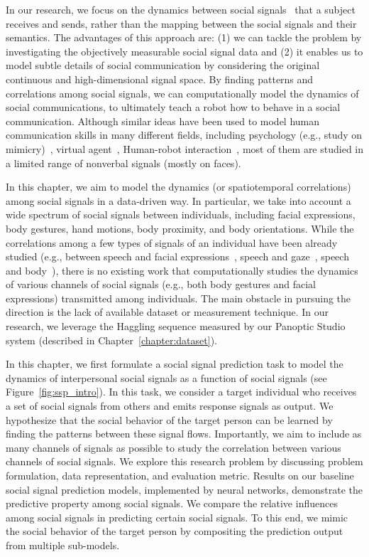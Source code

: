 In our research, we focus on the dynamics between social signals~\cite{pentland2004social} that a subject receives and sends, rather than the mapping between the social signals and their semantics. The advantages of this approach are: (1) we can tackle the problem by investigating the objectively measurable social signal data and (2) it enables us to model subtle details of social communication by considering the original continuous and high-dimensional signal space. By finding patterns and correlations among social signals, we can computationally model the dynamics of social communications, to ultimately teach a robot how to behave in a social communication. Although similar ideas have been used to model human communication skills in many different fields, including psychology (e.g., study on mimicry)~\cite{bernieri1988synchrony}, virtual agent~\cite{morency2008predicting,morency2010modeling}, Human-robot interaction~\cite{huang2014learning}, most of them are studied in a limited range of nonverbal signals (mostly on faces). 

In this chapter, we aim to model the dynamics (or spatiotemporal correlations) among social signals in a data-driven way. In particular, we take into account a wide spectrum of social signals between individuals, including facial expressions, body gestures, hand motions, body proximity, and body orientations. While the correlations among a few types of signals of an individual have been already studied (e.g., between speech and facial expressions~\cite{kendon1980gesticulation, mcneill1992hand}, speech and gaze~\cite{griffin2001gaze}, speech and body~\cite{levine2010gesture,marsella2013virtual}), there is no existing work that computationally studies the dynamics of various channels of social signals (e.g., both body gestures and facial expressions) transmitted among individuals. The main obstacle in pursuing the direction is the lack of available dataset or measurement technique. In our research, we leverage the Haggling sequence measured by our Panoptic Studio system (described in Chapter~\ref{chapter:dataset}).

In this chapter, we first formulate a social signal prediction task to model the dynamics of interpersonal social signals as a function of social signals (see Figure~\ref{fig:ssp_intro}). In this task, we consider a target individual who receives a set of social signals from others and emits response signals as output. We hypothesize that the social behavior of the target person can be learned by finding the patterns between these signal flows. Importantly, we aim to include as many channels of signals as possible to study the correlation between various channels of social signals. We explore this research problem by discussing problem formulation, data representation, and evaluation metric. Results on our baseline social signal prediction models, implemented by neural networks, demonstrate the predictive property among social signals. We compare the relative influences among social signals in predicting certain social signals. To this end, we mimic the social behavior of the target person by compositing the prediction output from multiple sub-models.



